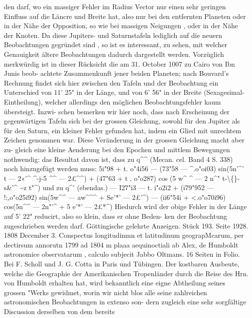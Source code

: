 \documentclass[12pt,a4paper]{article}
\begin{document}
den  darf,  wo  ein  massiger  Fehler  im  Radius  Vector  nur  einen  sehr  geringen  Einfluss  auf  die  Läncre  und Breite  hat,  also  nur  bei  den  entfernten  Planeten  oder  in  der  Nähe  der  Opposition,  so  wie  bei  massigen Neigungen ,  oder  in  der  Nähe  der  Knoten. Da  diese  Jupiters-  und  Saturnstafeln  lediglich  auf  die  neuern  Beobachtungen  gegründet  sind ,  so ist  es  interessant,  zu  sehen,  mit  welcher  Genauigkeit  ältere  Beobachtungen  dadurch  dargestellt  werden. Vorzüglich  merkwürdig  ist  in  dieser  Rücksicht  die  am  31.  October  1007  zu  Cairo  von  Ibn  Junis  beob- achtete Zusammenkunft  jener  beiden  Planeten;  nach  Bouvard's  Rechnung  findet  sich  hier  zwischen  den Tafeln  und  der  Beobachtung  ein  Unterschied  von  11'  25"  in  der  Länge,  und  von  6'  56"  in  der  Breite (Sexagesimal-Eintheilung),  welcher  allerdings  den  möglichen  Beobachtungsfehler  kaum  übersteigt.  Inzwi- schen bemerken  wir  hier  noch,  dass  nach  Erscheinung  der  gegenwärtigen  Tafeln  sich  bei  der  grossen Gleichung,  sowohl  für  den  Jupiter  als  für  den  Saturn,  ein  kleiner  Fehler  gefunden  hat,  indem  ein  Glied mit  unrechtem  Zeichen  genommen  war.  Diese  Veränderung  in  der  grossen  Gleichung  macht  aber  zu- gleich eine  kleine  Aenderung  bei  den  Epochen  und  mittlem  Bewegungen  nothwendig:  das  Resultat davon  ist,   dass  zu   q\textasciicircum{}\textasciicircum{}   (Mecan.   cel.  Band  4   S.  338)    noch   hinzugefügt   werden  muss: 5i"98  +  t.  o"4i56  ---  (73"58  ---  \textasciicircum{}.o"oi03)  sin(5n'\textasciicircum{}'  t ---  2«'\textasciicircum{}  \textasciicircum{}-j-5  \textasciicircum{}\textasciicircum{}  ---  2£\textasciicircum{}\textasciicircum{}) +  (47"63  +  t .  o"o287)  cos  (5  w\textasciicircum{}  \textasciicircum{}  ---  2  n\textasciicircum{}"  t-\textbackslash\{\}-s\&'\textasciicircum{}  \textasciitilde{}z  t"\textasciicircum{}) und  zu   q\textasciicircum{}'   (ebendas.) ---  I27"i3  ---  t.  i"o2i2  +  (i79"952  --- !;,o"o25i92)  sin(5w\textasciicircum{}\textasciicircum{}  --- aw\textasciicircum{}\textasciicircum{}\textasciicircum{}  +  Se'*'  --- 2£'\textasciicircum{}) ---  (ii6"54i  +  <.o"o70i96)  cos(5n\textasciicircum{}\textasciicircum{} --- 2n"'\textasciicircum{}  +  5  e'*'  ---  2£*\textasciicircum{}) Hiedurch  wird  der  obige  Fehler  in  der  Länge  auf  5'  22"  reducirt,  also  so  klein,  dass  er  ohne  Beden- ken der  Beobachtung  zugeschrieben  werden  darf. Göttingische  gelehrte  Anzeigen.     Stück  193.     Seite  1928.     1808  December  3. Conspectus  longitudinmn  et  latitudinum  geograpMcarum,  per  dectirsum  annorutn  1799  ad  1804  m  plaaa aequinoctiali  ab  Alex,  de  Humboldt  astronomice  observatarum ,  calculo  subjecit  Jabbo  Oltmans.  16  Seiten in  Folio.     Bei  F.  Scholl  und  J.  G.  Cotta  in  Paris  und  Tübingen. Der  kostbaren  Ausbeute,  welche  die  Geographie  der  Amerikanischen  Tropenländer  durch  die Reise  des  Hrn.  von  Humboldt  erhalten  hat,  wird  bekanntlich  eine  eigne  Abtheilung  seines  grossen  "Werks gewidmet,  worin  wir  nicht  blos  alle  seine  zahlreichen  astronomischen  Beobachtungen  in  extenso  son- dern zugleich  eine  sehr  sorgfältige  Discussion  derselben  von  dem  bereits  
\end{document}
